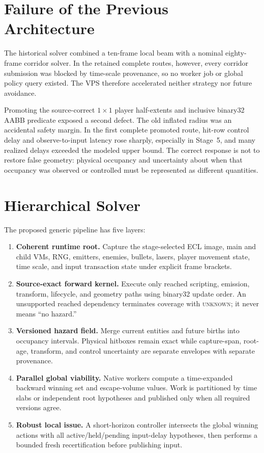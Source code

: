 \documentclass[10pt]{article}
\newcommand{\unknown}{\textsc{unknown}}
\begin{document}
\section{Failure of the Previous Architecture}

The historical solver combined a ten-frame local beam with a nominal
eighty-frame corridor solver.  In the retained complete routes, however, every
corridor submission was blocked by time-scale provenance, so no worker job or
global policy query existed.  The VPS therefore accelerated neither strategy
nor future avoidance.

Promoting the source-correct $1\times1$ player half-extents and inclusive
binary32 AABB predicate exposed a second defect.  The old inflated radius was
an accidental safety margin.  In the first complete promoted route, hit-row
control delay and observe-to-input latency rose sharply, especially in Stage~5,
and many realized delays exceeded the modeled upper bound.  The correct
response is not to restore false geometry: physical occupancy and uncertainty
about when that occupancy was observed or controlled must be represented as
different quantities.

\section{Hierarchical Solver}

The proposed generic pipeline has five layers:

\begin{enumerate}
  \item \textbf{Coherent runtime root.} Capture the stage-selected ECL image,
  main and child VMs, RNG, emitters, enemies, bullets, lasers, player movement
  state, time scale, and input transaction state under explicit frame brackets.
  \item \textbf{Source-exact forward kernel.} Execute only reached scripting,
  emission, transform, lifecycle, and geometry paths using binary32 update
  order.  An unsupported reached dependency terminates coverage with
  \unknown{}; it never means ``no hazard.''
  \item \textbf{Versioned hazard field.} Merge current entities and future
  births into occupancy intervals.  Physical hitboxes remain exact while
  capture-span, root-age, transform, and control uncertainty are separate
  envelopes with separate provenance.
  \item \textbf{Parallel global viability.} Native workers compute a
  time-expanded backward winning set and escape-volume values.  Work is
  partitioned by time slabs or independent root hypotheses and published only
  when all required versions agree.
  \item \textbf{Robust local issue.} A short-horizon controller intersects the
  global winning actions with all active/held/pending input-delay hypotheses,
  then performs a bounded fresh recertification before publishing input.
\end{enumerate}
\end{document}
